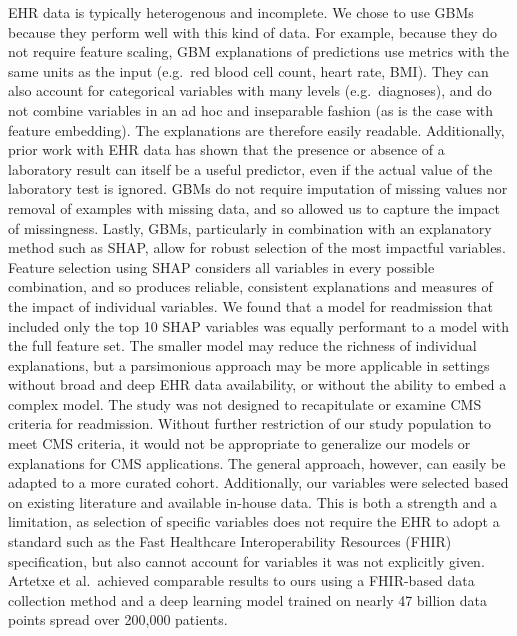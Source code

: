EHR data is typically heterogenous and incomplete.
We chose to use GBMs because they perform well with this kind of data.\@
For example, because they do not require feature scaling,
GBM explanations of predictions use metrics with the same units as the input 
(e.g.\ red blood cell count, heart rate, BMI).
They can also account for categorical variables with many levels (e.g.\ diagnoses), 
and do not combine variables in an ad hoc and inseparable fashion (as is the case with feature embedding).\@
The explanations are therefore easily readable.\@
Additionally, prior work with EHR data has shown that the presence or absence of a laboratory result can itself be a useful predictor,
even if the actual value of the laboratory test is ignored.\supercite{Agniel2018}
GBMs do not require imputation of missing values 
nor removal of examples with missing data, and so allowed us to capture the impact of missingness.\@
Lastly, GBMs, particularly in combination with an explanatory method such as SHAP,
allow for robust selection of the most impactful variables.\@
Feature selection using SHAP considers all variables in every possible combination, and so produces reliable, consistent explanations
and measures of the impact of individual variables.\@
We found that a model for readmission that included only the top 10 SHAP variables
was equally performant to a model with the full feature set.\@
The smaller model may reduce the richness of individual
explanations, but a parsimonious approach may be more applicable in settings without 
broad and deep EHR data availability, or without the ability to embed a complex model.\@
{}
The study was not designed to recapitulate or examine CMS criteria for readmission.\@
Without further restriction of our study population to meet CMS criteria,
it would not be appropriate to generalize our models or explanations for CMS applications.\@
The general approach, however, can easily be adapted to a more curated cohort.\@
Additionally, our variables were selected based on existing literature and available in-house data.
This is both a strength and a limitation, 
as selection of specific variables does not require the EHR to adopt a standard 
such as the Fast Healthcare Interoperability Resources (FHIR) specification,
but also cannot account for variables it was not explicitly given.
Artetxe et al.\ achieved comparable results to ours using a FHIR-based 
data collection method and a deep learning model trained on nearly 
47 billion data points spread over 200,000 patients.\supercite{Artetxe2018}
